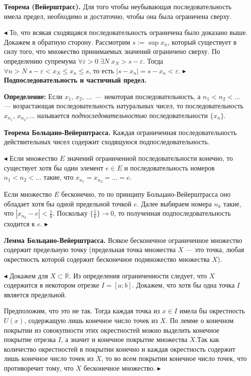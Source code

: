 \documentclass[12pt]{article}
\begin{document}
\textbf{Теорема (Вейерштрасс).} Для того чтобы неубывающая последовательность имела предел, необходимо и достаточно, чтобы она была ограничена сверху. 

$\blacktriangleleft$ То, что всякая сходящаяся последовательность ограничена было доказано выше. Докажем в обратную сторону. Рассмотрим $s := \sup x_n$, который существует в силу того, что множество принимаемых значений ограничено сверху. По определению супремума $\forall \varepsilon > 0 \; \exists N \; x_N > s - \varepsilon$. Тогда $\forall n > N \;  s- \varepsilon < x_N \leq x_n \leq s$, то есть $|s - x_n| = s - x_n < \varepsilon$.
$\blacktriangleright$ \\ 


\textbf{Подпоследовательность и частичный предел.}

\textbf{Определение:} Если $x_1, \, x_2, \, ... \, $ --- некоторая последовательность, а $n_1 < n_2 < ...$ --- возрастающая последовательность натуральных чисел, то последовательность $x_{n_1}, \,x_{n_2}, ...$ называется \textit{подпоследовательностью} последовательности $\{x_n\}$. 

\textbf{Теорема Больцано-Вейерштрасса.} Каждая ограниченная последовательность действительных чисел содержит сходящуюся подпоследовательность. 

$\blacktriangleleft$
Если множество $E$ значений ограниченной последовательности конечно, то существует хотя бы один элемент $e \in E$ и последовательность номеров $ n_1 < n_2<...$ такие, что $x_{n_1} = x_{n_2} = ... = e$. 

Если множество $E$ бесконечно, то по принципу Больцано-Вейерштрасса оно обладает хотя бы одной предельной точкой $e$. Далее выбираем номера $n_k$ такие, что $|x_{n_k} - e| < \frac{1}{k}$. Поскольку $\{  \frac{1}{k} \} \rightarrow 0$, то полученная подпоследовательность сходится к $e$.
$\blacktriangleright$

\textbf{Лемма Больцано-Вейерштрасса.} Всякое бесконечное ограниченное множество содержит предельную точку (предельная точка множества $X$ --- это точка, любая окрестность которой содержит бесконечное подмножество множества $X$).


$\blacktriangleleft$
Докажем для $X \subset \mathbb{R}$. Из определения ограниченности следует, что $X$ содержится в некотором отрезке $ I =[a;b]$. Докажем, что хотя бы одна точка $I$ является предельной. 

Предположим, что это не так. Тогда каждая точка из $x \in I$ имела бы окрестность $U(x)$, содержащую лишь конечное число точек из $X$. По лемме о конечном покрытии из совокупности этих окрестностей можно выделить конечное покрытие отрезка $I$, а значит и конечное покрытие множества $X$.Так как количество окрестностей в покрытии конечно и каждая окрестность содержит лишь конечное число точек из $X$, то во всем покрытии конечное число точек, что противоречит тому, что $X$ бесконечное множество.
$\blacktriangleright$ \\
\end{document}
